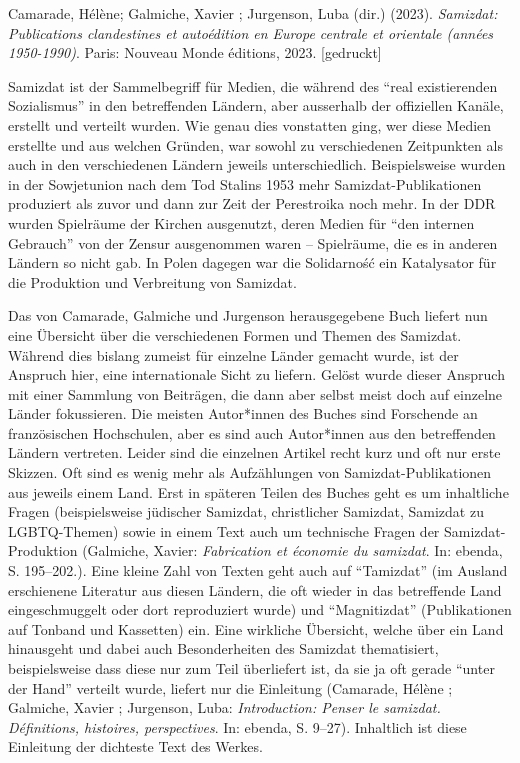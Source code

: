 \documentclass[a4paper,
fontsize=11pt,
oneside,
numbers=noperiodatend,
parskip=half-,
bibliography=totoc,
final
]{scrartcl}
\begin{document}
Camarade, Hélène; Galmiche, Xavier ; Jurgenson, Luba (dir.) (2023).
\emph{Samizdat: Publications clandestines et autoédition en Europe
centrale et orientale (années 1950-1990)}. Paris: Nouveau Monde
éditions, 2023. {[}gedruckt{]}

Samizdat ist der Sammelbegriff für Medien, die während des \enquote{real
existierenden Sozialismus} in den betreffenden Ländern, aber ausserhalb
der offiziellen Kanäle, erstellt und verteilt wurden. Wie genau dies
vonstatten ging, wer diese Medien erstellte und aus welchen Gründen, war
sowohl zu verschiedenen Zeitpunkten als auch in den verschiedenen
Ländern jeweils unterschiedlich. Beispielsweise wurden in der
Sowjetunion nach dem Tod Stalins 1953 mehr Samizdat-Publikationen
produziert als zuvor und dann zur Zeit der Perestroika noch mehr. In der
DDR wurden Spielräume der Kirchen ausgenutzt, deren Medien für
\enquote{den internen Gebrauch} von der Zensur ausgenommen waren --
Spielräume, die es in anderen Ländern so nicht gab. In Polen dagegen war
die Solidarność ein Katalysator für die Produktion und Verbreitung von
Samizdat.

Das von Camarade, Galmiche und Jurgenson herausgegebene Buch liefert nun
eine Übersicht über die verschiedenen Formen und Themen des Samizdat.
Während dies bislang zumeist für einzelne Länder gemacht wurde, ist der
Anspruch hier, eine internationale Sicht zu liefern. Gelöst wurde dieser
Anspruch mit einer Sammlung von Beiträgen, die dann aber selbst meist
doch auf einzelne Länder fokussieren. Die meisten Autor*innen des Buches
sind Forschende an französischen Hochschulen, aber es sind auch
Autor*innen aus den betreffenden Ländern vertreten. Leider sind die
einzelnen Artikel recht kurz und oft nur erste Skizzen. Oft sind es
wenig mehr als Aufzählungen von Samizdat-Publikationen aus jeweils einem
Land. Erst in späteren Teilen des Buches geht es um inhaltliche Fragen
(beispielsweise jüdischer Samizdat, christlicher Samizdat, Samizdat zu
LGBTQ-Themen) sowie in einem Text auch um technische Fragen der
Samizdat-Produktion (Galmiche, Xavier: \emph{Fabrication et économie du
samizdat}. In: ebenda, S. 195--202.). Eine kleine Zahl von Texten geht
auch auf \enquote{Tamizdat} (im Ausland erschienene Literatur aus diesen
Ländern, die oft wieder in das betreffende Land eingeschmuggelt oder
dort reproduziert wurde) und \enquote{Magnitizdat} (Publikationen auf
Tonband und Kassetten) ein. Eine wirkliche Übersicht, welche über ein
Land hinausgeht und dabei auch Besonderheiten des Samizdat thematisiert,
beispielsweise dass diese nur zum Teil überliefert ist, da sie ja oft
gerade \enquote{unter der Hand} verteilt wurde, liefert nur die
Einleitung (Camarade, Hélène ; Galmiche, Xavier ; Jurgenson, Luba:
\emph{Introduction: Penser le samizdat. Définitions, histoires,
perspectives}. In: ebenda, S. 9--27). Inhaltlich ist diese Einleitung
der dichteste Text des Werkes.
\end{document}
